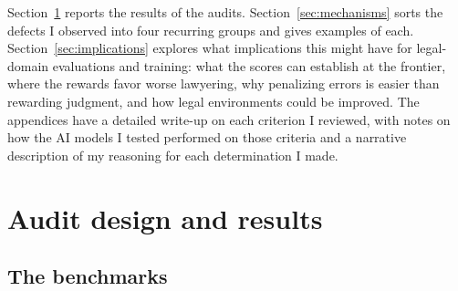 \documentclass[11pt]{article}
\begin{document}
Section~\ref{sec:design} reports the results of the audits. Section~\ref{sec:mechanisms} sorts the defects I observed into four recurring groups and gives examples of each. Section~\ref{sec:implications} explores what implications this might have for legal-domain evaluations and training: what the scores can establish at the frontier, where the rewards favor worse lawyering, why penalizing errors is easier than rewarding judgment, and how legal environments could be improved. The appendices have a detailed write-up on each criterion I reviewed, with notes on how the AI models I tested performed on those criteria and a narrative description of my reasoning for each determination I made.

\section{Audit design and results}
\label{sec:design}

\subsection{The benchmarks}
\label{sec:benchmarks}
\end{document}
